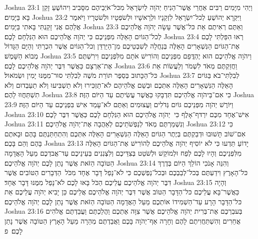 Joshua 23:1	וַיְהִי מִיָּמִים רַבִּים אַחֲרֵי אֲשֶׁר־הֵנִיחַ יְהֹוָה לְיִשְׂרָאֵל מִכּל־אֹיְבֵיהֶם מִסָּבִיב וִיהוֹשֻׁעַ זָקֵן בָּא בַּיָּמִים׃
Joshua 23:2	וַיִּקְרָא יְהוֹשֻׁעַ לְכל־יִשְׂרָאֵל לִזְקֵנָיו וּלְרָאשָׁיו וּלְשֹׁפְטָיו וּלְשֹׁטְרָיו וַיֹּאמֶר אֲלֵהֶם אֲנִי זָקַנְתִּי בָּאתִי בַּיָּמִים׃
Joshua 23:3	וְאַתֶּם רְאִיתֶם אֵת כּל־אֲשֶׁר עָשָׂה יְהֹוָה אֱלֹהֵיכֶם לְכל־הַגּוֹיִם הָאֵלֶּה מִפְּנֵיכֶם כִּי יְהֹוָה אֱלֹהֵיכֶם הוּא הַנִּלְחָם לָכֶם׃
Joshua 23:4	רְאוּ הִפַּלְתִּי לָכֶם אֶת־הַגּוֹיִם הַנִּשְׁאָרִים הָאֵלֶּה בְּנַחֲלָה לְשִׁבְטֵיכֶם מִן־הַיַּרְדֵּן וְכל־הַגּוֹיִם אֲשֶׁר הִכְרַתִּי וְהַיָּם הַגָּדוֹל מְבוֹא הַשָּׁמֶשׁ׃
Joshua 23:5	וַיהֹוָה אֱלֹהֵיכֶם הוּא יֶהְדֳּפֵם מִפְּנֵיכֶם וְהוֹרִישׁ אֹתָם מִלִּפְנֵיכֶם וִירִשְׁתֶּם אֶת־אַרְצָם כַּאֲשֶׁר דִּבֶּר יְהֹוָה אֱלֹהֵיכֶם לָכֶם׃
Joshua 23:6	וַחֲזַקְתֶּם מְאֹד לִשְׁמֹר וְלַעֲשׂוֹת אֵת כּל־הַכָּתוּב בְּסֵפֶר תּוֹרַת מֹשֶׁה לְבִלְתִּי סוּר־מִמֶּנּוּ יָמִין וּשְׂמֹאול׃
Joshua 23:7	לְבִלְתִּי־בֹא בַּגּוֹיִם הָאֵלֶּה הַנִּשְׁאָרִים הָאֵלֶּה אִתְּכֶם וּבְשֵׁם אֱלֹהֵיהֶם לֹא־תַזְכִּירוּ וְלֹא תַשְׁבִּיעוּ וְלֹא תַעַבְדוּם וְלֹא תִשְׁתַּחֲווּ לָהֶם׃
Joshua 23:8	כִּי אִם־בַּיהֹוָה אֱלֹהֵיכֶם תִּדְבָּקוּ כַּאֲשֶׁר עֲשִׂיתֶם עַד הַיּוֹם הַזֶּה׃
Joshua 23:9	וַיּוֹרֶשׁ יְהֹוָה מִפְּנֵיכֶם גּוֹיִם גְּדֹלִים וַעֲצוּמִים וְאַתֶּם לֹא־עָמַד אִישׁ בִּפְנֵיכֶם עַד הַיּוֹם הַזֶּה׃
Joshua 23:10	אִישׁ־אֶחָד מִכֶּם יִרְדּף־אָלֶף כִּי  יְהֹוָה אֱלֹהֵיכֶם הוּא הַנִּלְחָם לָכֶם כַּאֲשֶׁר דִּבֶּר לָכֶם׃
Joshua 23:11	וְנִשְׁמַרְתֶּם מְאֹד לְנַפְשֹׁתֵיכֶם לְאַהֲבָה אֶת־יְהֹוָה אֱלֹהֵיכֶם׃
Joshua 23:12	כִּי  אִם־שׁוֹב תָּשׁוּבוּ וּדְבַקְתֶּם בְּיֶתֶר הַגּוֹיִם הָאֵלֶּה הַנִּשְׁאָרִים הָאֵלֶּה אִתְּכֶם וְהִתְחַתַּנְתֶּם בָּהֶם וּבָאתֶם בָּהֶם וְהֵם בָּכֶם׃
Joshua 23:13	יָדוֹעַ תֵּדְעוּ כִּי לֹא יוֹסִיף יְהֹוָה אֱלֹהֵיכֶם לְהוֹרִישׁ אֶת־הַגּוֹיִם הָאֵלֶּה מִלִּפְנֵיכֶם וְהָיוּ לָכֶם לְפַח וּלְמוֹקֵשׁ וּלְשֹׁטֵט בְּצִדֵּיכֶם וְלִצְנִנִים בְּעֵינֵיכֶם עַד־אֲבדְכֶם מֵעַל הָאֲדָמָה הַטּוֹבָה הַזֹּאת אֲשֶׁר נָתַן לָכֶם יְהֹוָה אֱלֹהֵיכֶם׃
Joshua 23:14	וְהִנֵּה אָנֹכִי הוֹלֵךְ הַיּוֹם בְּדֶרֶךְ כּל־הָאָרֶץ וִידַעְתֶּם בְּכל־לְבַבְכֶם וּבְכל־נַפְשְׁכֶם כִּי לֹא־נָפַל דָּבָר אֶחָד מִכֹּל  הַדְּבָרִים הַטּוֹבִים אֲשֶׁר דִּבֶּר יְהֹוָה אֱלֹהֵיכֶם עֲלֵיכֶם הַכֹּל בָּאוּ לָכֶם לֹא־נָפַל מִמֶּנּוּ דָּבָר אֶחָד׃
Joshua 23:15	וְהָיָה כַּאֲשֶׁר־בָּא עֲלֵיכֶם כּל־הַדָּבָר הַטּוֹב אֲשֶׁר דִּבֶּר יְהֹוָה אֱלֹהֵיכֶם אֲלֵיכֶם כֵּן יָבִיא יְהֹוָה עֲלֵיכֶם אֵת כּל־הַדָּבָר הָרָע עַד־הַשְׁמִידוֹ אוֹתְכֶם מֵעַל הָאֲדָמָה הַטּוֹבָה הַזֹּאת אֲשֶׁר נָתַן לָכֶם יְהֹוָה אֱלֹהֵיכֶם׃
Joshua 23:16	בְּעבְרְכֶם אֶת־בְּרִית יְהֹוָה אֱלֹהֵיכֶם אֲשֶׁר צִוָּה אֶתְכֶם וַהֲלַכְתֶּם וַעֲבַדְתֶּם אֱלֹהִים אֲחֵרִים וְהִשְׁתַּחֲוִיתֶם לָהֶם וְחָרָה אַף־יְהֹוָה בָּכֶם וַאֲבַדְתֶּם מְהֵרָה מֵעַל הָאָרֶץ הַטּוֹבָה אֲשֶׁר נָתַן לָכֶם׃ {פ}
